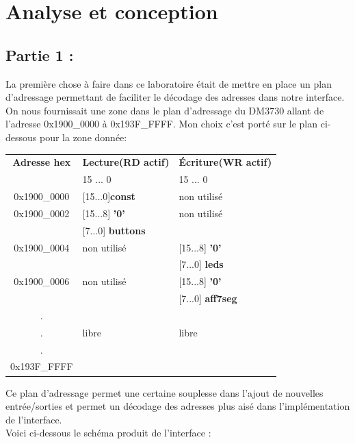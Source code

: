 \section{Analyse et conception}

\subsection*{Partie 1 :}
La première chose à faire dans ce laboratoire était de mettre en place un plan d'adressage permettant de faciliter le décodage des adresses dans notre interface. On nous fournissait une zone dans le plan d'adressage du DM3730 allant de l'adresse 0x1900\_0000 à 0x193F\_FFFF. Mon choix c'est porté sur le plan ci-dessous pour la zone donnée:\\
\begin{center}
\begin{tabular}{|c|l|l|}
\hline
\textbf{Adresse hex} & \textbf{Lecture(RD actif)} & \textbf{Écriture(WR actif)} \\
			& 15    ...      0  & 15     ...      0  \\
\hline
\hline 
\hline
0x1900\_0000 & [15...0]\textbf{const} & non utilisé\\
\hline
0x1900\_0002 & [15...8] \textbf{'0'} & non utilisé\\
			 & [7...0] \textbf{buttons} & \\
\hline
0x1900\_0004 & non utilisé & [15...8] \textbf{'0'}\\
			 &             & [7...0] \textbf{leds} \\
\hline
0x1900\_0006 & non utilisé & [15...8] \textbf{'0'}\\
			 &             & [7...0] \textbf{aff7seg} \\
\hline
. & & \\
.& libre & libre\\
. & &\\
0x193F\_FFFF & &\\ 
\hline
\end{tabular}
\end{center}
\par
Ce plan d'adressage permet une certaine souplesse dans l'ajout de nouvelles entrée/sorties et permet un décodage des adresses plus aisé dans l'implémentation de l'interface.\\
Voici ci-dessous le schéma produit de l'interface : \\
